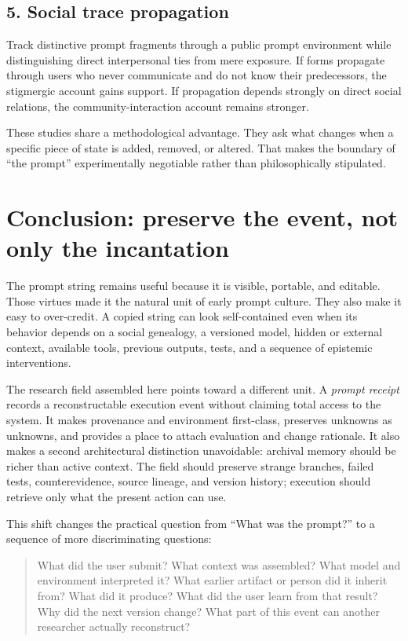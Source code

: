 \documentclass[11pt]{article}
\begin{document}
\subsection*{5. Social trace propagation}
Track distinctive prompt fragments through a public prompt environment while distinguishing direct interpersonal ties from mere exposure. If forms propagate through users who never communicate and do not know their predecessors, the stigmergic account gains support. If propagation depends strongly on direct social relations, the community-interaction account remains stronger.

These studies share a methodological advantage. They ask what changes when a specific piece of state is added, removed, or altered. That makes the boundary of ``the prompt'' experimentally negotiable rather than philosophically stipulated.

\section{Conclusion: preserve the event, not only the incantation}

The prompt string remains useful because it is visible, portable, and editable. Those virtues made it the natural unit of early prompt culture. They also make it easy to over-credit. A copied string can look self-contained even when its behavior depends on a social genealogy, a versioned model, hidden or external context, available tools, previous outputs, tests, and a sequence of epistemic interventions.

The research field assembled here points toward a different unit. A \emph{prompt receipt} records a reconstructable execution event without claiming total access to the system. It makes provenance and environment first-class, preserves unknowns as unknowns, and provides a place to attach evaluation and change rationale. It also makes a second architectural distinction unavoidable: archival memory should be richer than active context. The field should preserve strange branches, failed tests, counterevidence, source lineage, and version history; execution should retrieve only what the present action can use.

This shift changes the practical question from ``What was the prompt?'' to a sequence of more discriminating questions:

\begin{quote}
What did the user submit? What context was assembled? What model and environment interpreted it? What earlier artifact or person did it inherit from? What did it produce? What did the user learn from that result? Why did the next version change? What part of this event can another researcher actually reconstruct?
\end{quote}
\end{document}
